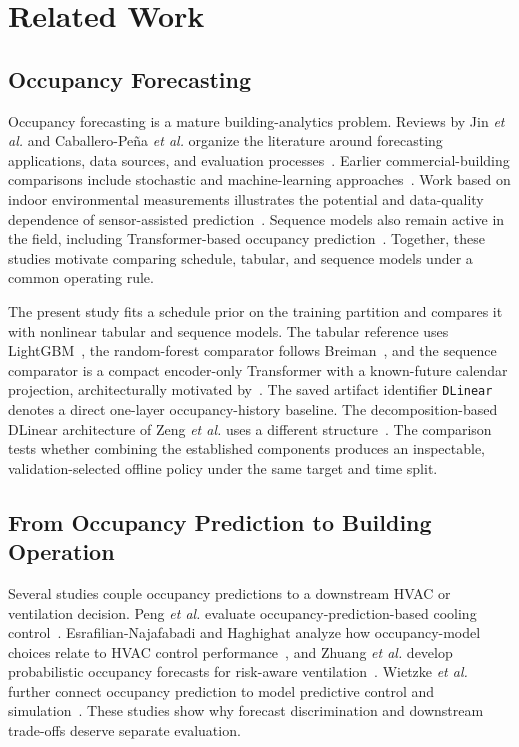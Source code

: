 \section{Related Work}

\subsection{Occupancy Forecasting}

Occupancy forecasting is a mature building-analytics problem. Reviews by Jin \emph{et al.} and Caballero-Pe\~na \emph{et al.} organize the literature around forecasting applications, data sources, and evaluation processes~\cite{Jin2021,CaballeroPena2024}. Earlier commercial-building comparisons include stochastic and machine-learning approaches~\cite{LiDong2018}. Work based on indoor environmental measurements illustrates the potential and data-quality dependence of sensor-assisted prediction~\cite{RyuMoon2016}. Sequence models also remain active in the field, including Transformer-based occupancy prediction~\cite{Sun2023}. Together, these studies motivate comparing schedule, tabular, and sequence models under a common operating rule.

The present study fits a schedule prior on the training partition and compares it with nonlinear tabular and sequence models. The tabular reference uses LightGBM~\cite{Ke2017}, the random-forest comparator follows Breiman~\cite{Breiman2001}, and the sequence comparator is a compact encoder-only Transformer with a known-future calendar projection, architecturally motivated by~\cite{Vaswani2017}. The saved artifact identifier \texttt{DLinear} denotes a direct one-layer occupancy-history baseline. The decomposition-based DLinear architecture of Zeng \emph{et al.} uses a different structure~\cite{Zeng2023}. The comparison tests whether combining the established components produces an inspectable, validation-selected offline policy under the same target and time split.

\subsection{From Occupancy Prediction to Building Operation}

Several studies couple occupancy predictions to a downstream HVAC or ventilation decision. Peng \emph{et al.} evaluate occupancy-prediction-based cooling control~\cite{Peng2018}. Esrafilian-Najafabadi and Haghighat analyze how occupancy-model choices relate to HVAC control performance~\cite{EsrafilianNajafabadi2022}, and Zhuang \emph{et al.} develop probabilistic occupancy forecasts for risk-aware ventilation~\cite{Zhuang2022}. Wietzke \emph{et al.} further connect occupancy prediction to model predictive control and simulation~\cite{Wietzke2024}. These studies show why forecast discrimination and downstream trade-offs deserve separate evaluation.

